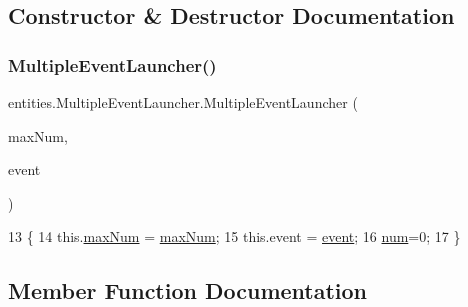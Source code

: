 \subsection{Constructor \& Destructor Documentation}
\mbox{\label{classentities_1_1_multiple_event_launcher_a9ccdc84e550b1c2de8d96d4fe52adc1c}} 
\subsubsection{\texorpdfstring{Multiple\+Event\+Launcher()}{MultipleEventLauncher()}}
{\footnotesize\ttfamily entities.\+Multiple\+Event\+Launcher.\+Multiple\+Event\+Launcher (\begin{DoxyParamCaption}\item[{int}]{max\+Num,  }\item[{\mbox{\hyperlink{interfaceentities_1_1_event_launcher}{Event\+Launcher}}}]{event }\end{DoxyParamCaption})\hspace{0.3cm}{\ttfamily [inline]}}


\begin{DoxyCode}
13                                                                   \{
14         this.\mbox{\hyperlink{classentities_1_1_multiple_event_launcher_a236cd02f077a8fcc6afbfb425817a4f3}{maxNum}} = \mbox{\hyperlink{classentities_1_1_multiple_event_launcher_a236cd02f077a8fcc6afbfb425817a4f3}{maxNum}};
15         this.\textcolor{keyword}{event} = \mbox{\hyperlink{classentities_1_1_multiple_event_launcher_a2b7fce6ca63ed808d27e9d1d0469ce4a}{event}};
16         \mbox{\hyperlink{classentities_1_1_multiple_event_launcher_a35cd67fc18c6015e136245890bbdd9b1}{num}}=0;
17     \}
\end{DoxyCode}


\subsection{Member Function Documentation}
\mbox{\label{classentities_1_1_multiple_event_launcher_a04d341ee9976ef057ab55b74ae99e6db}} 
